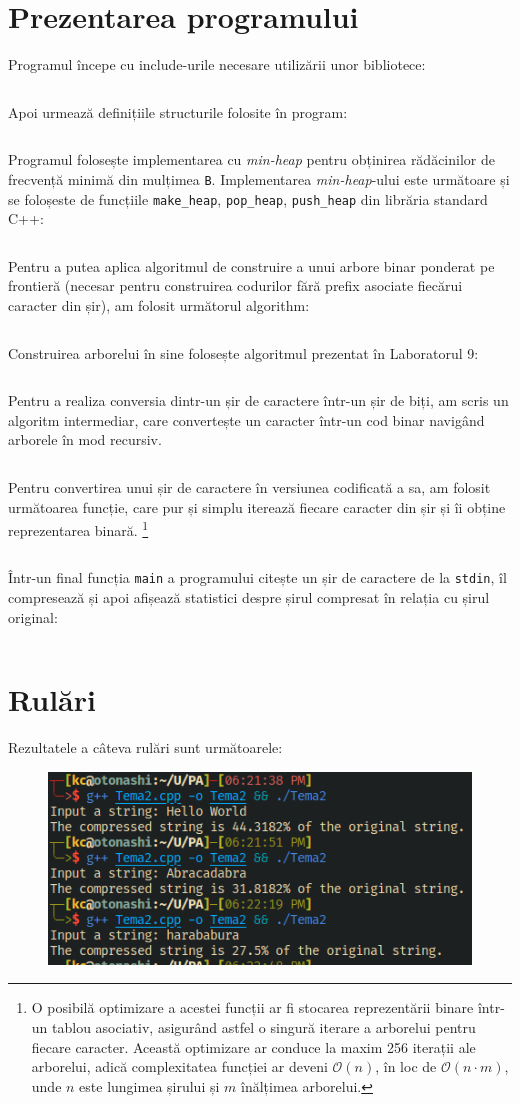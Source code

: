 \documentclass{article}
\newcommand{\code}[2]{\inputminted[linenos, breaklines, firstline=#1, lastline=#2]{c++}{Tema2.cpp}}
\begin{document}
    \section{Prezentarea programului}

    Programul începe cu include-urile necesare utilizării unor bibliotece:
    \code{1}{7}

    Apoi urmează definițiile structurile folosite în program:
    \code{9}{21}

    Programul folosește implementarea cu \emph{min-heap} pentru obținirea rădăcinilor de frecvență
    minimă din mulțimea \texttt{B}. Implementarea \emph{min-heap}-ului este următoare și se
    foloșeste de funcțiile \texttt{make\_heap}, \texttt{pop\_heap}, \texttt{push\_heap} din librăria
    standard C++:
    \code{23}{65}

    Pentru a putea aplica algoritmul de construire a unui arbore binar ponderat pe frontieră (necesar
    pentru construirea codurilor fără prefix asociate fiecărui caracter din șir), am folosit următorul
    algorithm:
    \code{67}{86}

    Construirea arborelui în sine folosește algoritmul prezentat în Laboratorul 9:
    \code{88}{106}

    Pentru a realiza conversia dintr-un șir de caractere într-un șir de biți, am scris
    un algoritm intermediar, care convertește un caracter într-un cod binar navigând
    arborele în mod recursiv.
    \code{108}{131}

    Pentru convertirea unui șir de caractere în versiunea codificată a sa, am folosit următoarea
    funcție, care pur și simplu iterează fiecare caracter din șir și îi obține reprezentarea binară.
    \footnote{O posibilă optimizare a acestei funcții ar fi stocarea reprezentării binare într-un
    tablou asociativ, asigurând astfel o singură iterare a arborelui pentru fiecare caracter. Această
    optimizare ar conduce la maxim 256 iterații ale arborelui, adică complexitatea funcției ar deveni
    $\mathcal{O}(n)$, în loc de $\mathcal{O}(n\cdot m)$, unde $n$ este lungimea șirului și $m$
    înălțimea arborelui.}
    \code{133}{143}

    Într-un final funcția \texttt{main} a programului citește un șir de caractere de la \texttt{stdin},
    îl compresează și apoi afișează statistici despre șirul compresat în relația cu șirul original:
    \code{145}{166}

    \newpage
    \section{Rulări}

    Rezultatele a câteva rulări sunt următoarele:
    \begin{figure}[H]
        \includegraphics[width=0.75\linewidth]{Tema2Rulari}
        \centering
    \end{figure}
\end{document}
